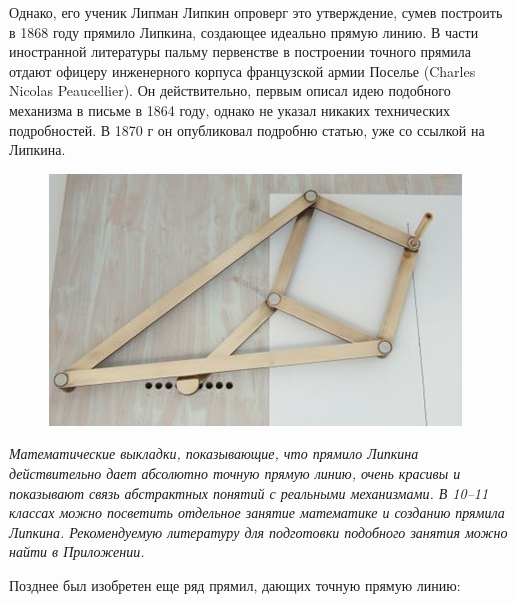 Однако, его ученик Липман Липкин опроверг это утверждение, сумев построить в 1868 году прямило Липкина, создающее идеально прямую линию. В части иностранной литературы пальму первенстве в построении точного прямила отдают офицеру инженерного корпуса французской армии Поселье (Charles Nicolas Peaucellier). Он действительно, первым описал идею подобного механизма в письме в 1864 году, однако не указал никаких технических подробностей. В 1870 г он опубликовал подробню статью, уже со ссылкой на Липкина.
\clearpage
\begin{figure}[h!]
	\begin{center}
		\includegraphics[width=1\linewidth]{chapters/chapter22/images/4}
		\caption{}
		\label{ris:image22x4}
	\end{center}
\end{figure}

{\slshape Математические выкладки, показывающие, что прямило Липкина действительно дает абсолютно точную прямую линию, очень красивы и показывают связь абстрактных понятий с реальными механизмами. В 10--11 классах можно посветить отдельное занятие математике и созданию прямила Липкина. Рекомендуемую литературу для подготовки подобного занятия можно найти в Приложении.}

Позднее был изобретен еще ряд прямил, дающих точную прямую линию:


